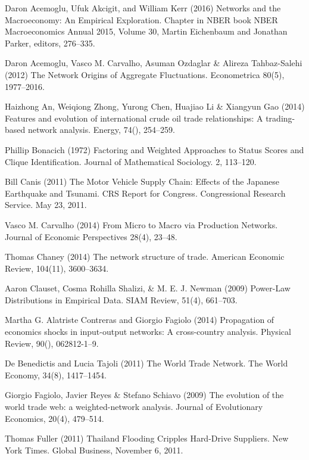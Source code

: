 \documentclass[10pt,letterpaper]{article}
\begin{document}
\begin{thebibliography}{99}
Daron Acemoglu, Ufuk Akcigit, and William Kerr (2016)
Networks and the Macroeconomy: An Empirical Exploration. 
Chapter in NBER book NBER Macroeconomics Annual 2015, Volume 30, Martin Eichenbaum and Jonathan Parker, editors, 276--335.

Daron Acemoglu, Vasco M. Carvalho, Asuman Ozdaglar \& Alireza Tahbaz-Salehi (2012) The Network Origins of Aggregate Fluctuations. Econometrica 80(5), 1977--2016.

Haizhong An, Weiqiong Zhong, Yurong Chen, Huajiao Li \& Xiangyun Gao (2014) Features and evolution of international crude oil trade relationships: A trading-based network analysis. Energy, 74(), 254--259. 

Phillip Bonacich (1972) Factoring and Weighted Approaches to Status Scores and Clique Identification. Journal of Mathematical Sociology. 2, 113--120.

Bill Canis (2011) The Motor Vehicle Supply Chain: Effects of the Japanese Earthquake and Tsunami. CRS Report for Congress. Congressional Research Service. May 23, 2011.

Vasco M. Carvalho (2014) From Micro to Macro via Production Networks. Journal of Economic Perspectives 28(4), 23--48.

Thomas Chaney (2014) The network structure of trade. American Economic Review, 104(11), 3600--3634.

Aaron Clauset, Cosma Rohilla Shalizi, \& M. E. J. Newman (2009) Power-Law Distributions in Empirical Data. SIAM Review, 51(4), 661--703.

Martha G. Alatriste Contreras and Giorgio Fagiolo (2014) Propagation of economics shocks in input-output networks: A cross-country analysis. Physical Review, 90(), 062812-1--9. 

De Benedictis and Lucia Tajoli (2011) The World Trade Network. The World Economy, 34(8), 1417--1454.  

Giorgio Fagiolo, Javier Reyes \& Stefano Schiavo (2009) The evolution of the world trade web: a weighted-network analysis. Journal of Evolutionary Economics, 20(4), 479--514.

Thomas Fuller (2011) Thailand Flooding Cripples Hard-Drive Suppliers. New York Times. Global Business, November 6, 2011.


\end{thebibliography}
\end{document}
